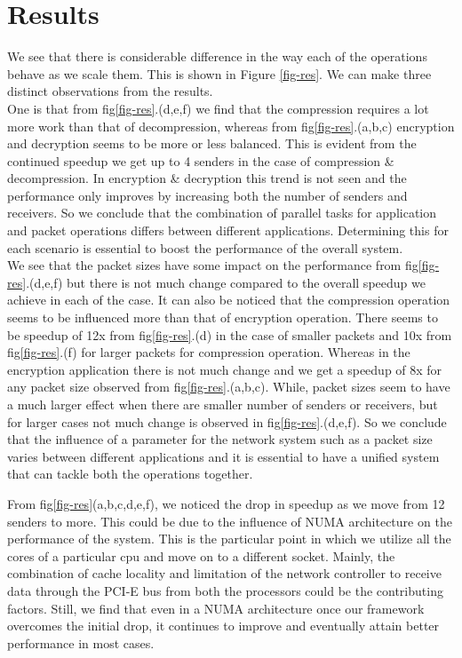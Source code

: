 \documentclass[conference]{IEEEtran}
\begin{document}
\section{Results}

We see that there is considerable difference in the way each of the operations behave as we scale them. This is shown in Figure \ref{fig-res}. We can make three distinct observations from the results. \\

One is that from fig\ref{fig-res}.(d,e,f) we find that the compression requires a lot more work than that of decompression, whereas from fig\ref{fig-res}.(a,b,c) encryption and decryption seems to be more or less balanced. This is evident from the continued speedup we get up to 4 senders in the case of compression \& decompression. In encryption \& decryption this trend is not seen and the performance only improves by increasing both the number of senders and receivers. So we conclude that the combination of parallel tasks for application and packet operations differs between different applications. Determining this for each scenario is essential to boost the performance of the overall system.\\

We see that the packet sizes have some impact on the performance from fig\ref{fig-res}.(d,e,f) but there is not much change compared to the overall speedup we achieve in each of the case. It can also be noticed that the compression operation seems to be influenced more than that of encryption operation. There seems to be speedup of 12x from fig\ref{fig-res}.(d) in the case of smaller packets and 10x from fig\ref{fig-res}.(f) for larger packets for compression operation. Whereas in the encryption application there is not much change and we get a speedup of 8x for any packet size observed from fig\ref{fig-res}.(a,b,c). While, packet sizes seem to have a much larger effect when there are smaller number of senders or receivers, but for larger cases not much change is observed in fig\ref{fig-res}.(d,e,f). So we conclude that the influence of a parameter for the network system such as a packet size varies between different applications and it is essential to have a unified system that can tackle both the operations together.

From fig\ref{fig-res}(a,b,c,d,e,f), we noticed the drop in speedup as we move from 12 senders to more. This could be due to the influence of NUMA architecture \cite{Awasthi:2010:HPO:1854273.1854314} on the performance of the system. This is the particular point in which we utilize all the cores of a particular cpu and move on to a different socket. Mainly, the combination of cache locality and limitation of the network controller to receive data through the PCI-E bus from both the processors could be the contributing factors. Still, we find that even in a NUMA architecture once our framework overcomes the initial drop, it continues to improve and eventually attain better performance in most cases.
\end{document}
